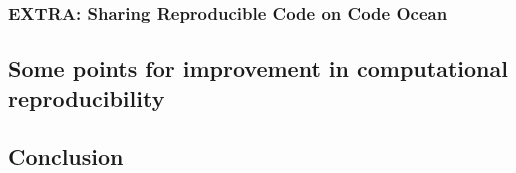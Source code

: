 \documentclass[
  oneside]{krantz}
\begin{document}
\hypertarget{extra-sharing-reproducible-code-on-code-ocean}{%
\subsubsection{EXTRA: Sharing Reproducible Code on Code
Ocean}\label{extra-sharing-reproducible-code-on-code-ocean}}

\hypertarget{some-points-for-improvement-in-computational-reproducibility}{%
\subsection{Some points for improvement in computational
reproducibility}\label{some-points-for-improvement-in-computational-reproducibility}}

\hypertarget{conclusion-1}{%
\subsection{Conclusion}\label{conclusion-1}}
\end{document}
